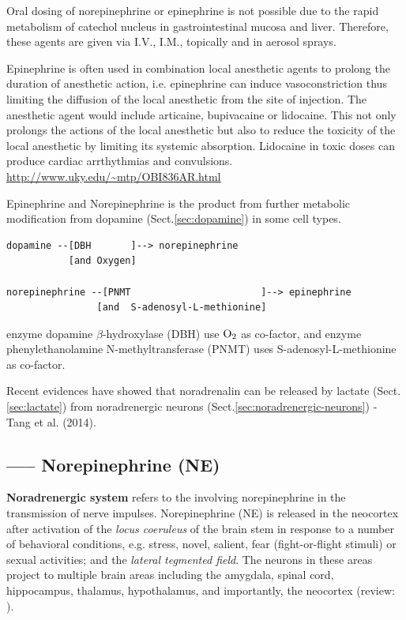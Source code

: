 \begin{mdframed}

Oral dosing of norepinephrine or epinephrine is not possible due to the rapid
metabolism of catechol nucleus in gastrointestinal mucosa and liver. Therefore,
these agents are given via I.V., I.M., topically and in aerosol sprays.

Epinephrine is often used in combination local anesthetic agents to prolong the
duration of anesthetic action, i.e.
epinephrine can induce vasoconstriction thus limiting the diffusion of the local
anesthetic from the site of injection. The anesthetic agent would include
articaine, bupivacaine or lidocaine.
This not only prolongs the actions of the local anesthetic but also to reduce
the toxicity of the local anesthetic by limiting its systemic absorption.
Lidocaine in toxic doses can produce cardiac arrthythmias and convulsions.
\url{http://www.uky.edu/~mtp/OBI836AR.html}
\end{mdframed}

Epinephrine and Norepinephrine is the product from further metabolic
modification from dopamine (Sect.\ref{sec:dopamine}) in some cell types.
\begin{verbatim}
dopamine --[DBH       ]--> norepinephrine
           [and Oxygen]
           
norepinephrine --[PNMT                       ]--> epinephrine
                [and  S-adenosyl-L-methionine]
\end{verbatim}
enzyme dopamine $\beta$-hydroxylase (DBH) use $\ce{O2}$ as co-factor, 
and enzyme phenylethanolamine N-methyltransferase (PNMT) uses
S-adenosyl-L-methionine as co-factor. 

Recent evidences have showed that noradrenalin can be released by lactate
(Sect.\ref{sec:lactate}) from noradrenergic neurons
(Sect.\ref{sec:noradrenergic-neurons}) - Tang et al.
(2014).

\subsection{----- Norepinephrine (NE)}

{\bf Noradrenergic system} refers to the involving norepinephrine in the
transmission of nerve impulses.
Norepinephrine (NE) is released in the neocortex after activation of the {\it
locus coeruleus} of the brain stem in response to a number of behavioral
conditions, e.g. stress, novel, salient, fear (fight-or-flight stimuli) or
sexual activities; and the {\it lateral tegmented field}. The neurons in these
areas project to multiple brain areas including the amygdala, spinal cord,
hippocampus, thalamus, hypothalamus, and importantly, the neocortex
(review: \citep{dinh2009}).

